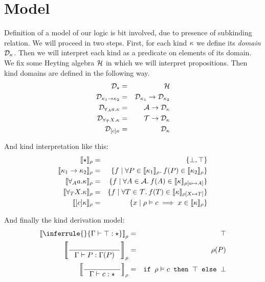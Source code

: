 \documentclass[english, mgr]{iithesis}
\begin{document}
\chapter{Model}

Definition of a model of our logic is bit involved,
due to presence of subkinding relation.
We will proceed in two steps.
First, for each kind $\kappa$ we define its \emph{domain} $\mathcal{D}_{\kappa}$.
Then we will interpret each kind as a predicate on elements of its domain.
We fix some Heyting algebra $\mathcal{H}$
in which we will interpret propositions.
Then kind domains are defined in the following way.
\begin{eqnarray*}
\mathcal{D}_{\star}                     & = & \mathcal{H} \\
\mathcal{D}_{\kappa_1 \to \kappa_2}    & = & \mathcal{D}_{\kappa_1} \rightarrow \mathcal{D}_{\kappa_2} \\
\mathcal{D}_{\forall_A a .\kappa}  & = & \mathcal{A}          \rightarrow \mathcal{D}_{\kappa} \\
\mathcal{D}_{\forall_T X .\kappa}  & = & \mathcal{T}          \rightarrow \mathcal{D}_{\kappa} \\
\mathcal{D}_{[c]\kappa}      & = & \mathcal{D}_{\kappa}
\end{eqnarray*}

And kind interpretation like this:
\begin{eqnarray*}
\llbracket \star \rrbracket_{\rho}                      & = & \{ \bot, \top \} \\
\llbracket \kappa_1 \to \kappa_2 \rrbracket_{\rho}     & = & \{f \mid \forall P \in \llbracket \kappa_1 \rrbracket_{\rho}.\: f(P) \in \llbracket \kappa_2 \rrbracket_{\rho} \} \\
\llbracket \forall_A a .\kappa \rrbracket_{\rho}   & = & \{f \mid \forall A \in \mathcal{A}.\: f(A) \in \llbracket \kappa \rrbracket_{\rho[a \mapsto A]}\} \\
\llbracket \forall_T X .\kappa \rrbracket_{\rho}   & = & \{f \mid \forall T \in \mathcal{T}.\: f(T) \in \llbracket \kappa \rrbracket_{\rho[X \mapsto T]}\} \\
\llbracket [c]\kappa \rrbracket_{\rho}       & = & \{x \mid \rho \vDash c \implies x \in \llbracket \kappa \rrbracket_{\rho} \}
\end{eqnarray*}



And finally the kind derivation model:
\begin{eqnarray*}
\interp{\inferrule{ }{\types{\top}{\kProp}}} & = & \top \\
\interp{\inference{ }{\types{ \propv}{\Gamma( \propv)}}} & = & \tmEnv(\propv) \\
    \interp{\inference{}{\types{\constr}{\kProp}}} & = & \texttt{if } \tmEnv \vDash \constr \texttt{ then } \top \texttt{ else } \bot
\end{eqnarray*}
\end{document}
